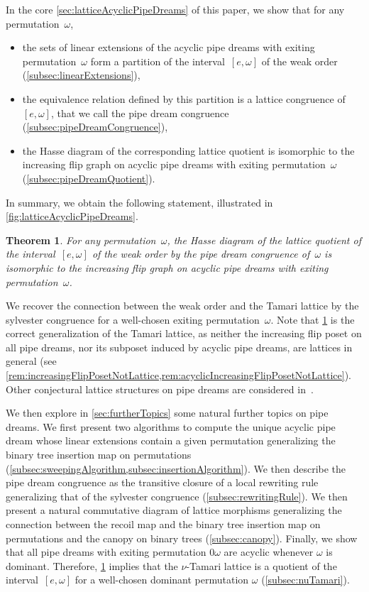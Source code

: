 \documentclass[reqno]{amsart}
\newtheorem{theoremA}{Theorem}
\theoremstyle{definition}
\begin{document}
In the core \cref{sec:latticeAcyclicPipeDreams} of this paper, we show that for any permutation~$\omega$,
\begin{itemize}
\item the sets of linear extensions of the acyclic pipe dreams with exiting permutation~$\omega$ form a partition of the interval~$[e,\omega]$ of the weak order (\cref{subsec:linearExtensions}),
\item the equivalence relation defined by this partition is a lattice congruence of~$[e, \omega]$, that we call the pipe dream congruence (\cref{subsec:pipeDreamCongruence}),
\item the Hasse diagram of the corresponding lattice quotient is isomorphic to the increasing flip graph on acyclic pipe dreams with exiting permutation~$\omega$ (\cref{subsec:pipeDreamQuotient}).
\end{itemize}
In summary, we obtain the following statement, illustrated in \cref{fig:latticeAcyclicPipeDreams}.

\begin{theoremA}
\label{thm:A}
For any permutation~$\omega$, the Hasse diagram of the lattice quotient of the interval~$[e,\omega]$ of the weak order by the pipe dream congruence of~$\omega$ is isomorphic to the increasing flip graph on acyclic pipe dreams with exiting permutation~$\omega$.
\end{theoremA}

We recover the connection between the weak order and the Tamari lattice by the sylvester congruence for a well-chosen exiting permutation~$\omega$.
Note that \cref{thm:A} is the correct generalization of the Tamari lattice, as neither the increasing flip poset on all pipe dreams, nor its subposet induced by acyclic pipe dreams, are lattices in general (see \cref{rem:increasingFlipPosetNotLattice,rem:acyclicIncreasingFlipPosetNotLattice}).
Other conjectural lattice structures on pipe dreams are considered in~\cite[Conj.~2.8]{Rubey}.

We then explore in \cref{sec:furtherTopics} some natural further topics on pipe dreams.
We first present two algorithms to compute the unique acyclic pipe dream whose linear extensions contain a given permutation generalizing the binary tree insertion map on permutations (\cref{subsec:sweepingAlgorithm,subsec:insertionAlgorithm}).
We then describe the pipe dream congruence as the transitive closure of a local rewriting rule generalizing that of the sylvester congruence (\cref{subsec:rewritingRule}).
We then present a natural commutative diagram of lattice morphisms generalizing the connection between the recoil map and the binary tree insertion map on permutations and the canopy on binary trees (\cref{subsec:canopy}).
Finally, we show that all pipe dreams with exiting permutation $0\omega$ are acyclic whenever $\omega$ is dominant. Therefore, \cref{thm:A} implies that the $\nu$-Tamari lattice is a quotient of the interval~$[e,\omega]$ for a well-chosen dominant permutation $\omega$ (\cref{subsec:nuTamari}).
\end{document}
